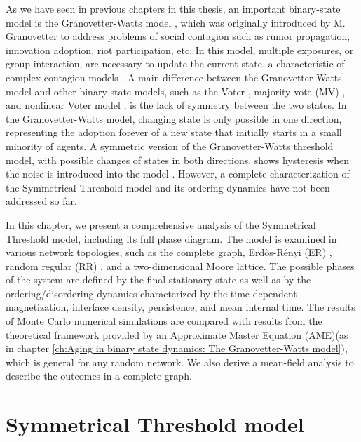 As we have seen in previous chapters in this thesis, an important binary-state model is the Granovetter-Watts model \cite{watts-2002}, which was originally introduced by M. Granovetter \cite{granovetter-1978} to address problems of social contagion such as rumor propagation, innovation adoption, riot participation, etc. In this model, multiple exposures, or group interaction, are necessary to update the current state, a characteristic of complex contagion models \cite{centola-2007,unknown-author-2018}. A main difference between the Granovetter-Watts model and other binary-state models, such as the Voter \cite{Voter-original}, majority vote (MV) \cite{de1992isotropic,pereira2005majority,campos2003small}, and nonlinear Voter model \cite{castellano-2009,mobilia2015nonlinear,mellor2016characterization,Min-2017,jewski-2017,peralta-2018}, is the lack of symmetry between the two states. In the Granovetter-Watts model, changing state is only possible in one direction, representing the adoption forever of a new state that initially starts in a small minority of agents. A symmetric version of the Granovetter-Watts threshold model, with possible changes of states in both directions, shows hysteresis when the noise is introduced into the model \cite{nowak2019homogeneous,nowak2020symmetrical}. However, a complete characterization of the Symmetrical Threshold model and its ordering dynamics have not been addressed so far.

In this chapter, we present a comprehensive analysis of the Symmetrical Threshold model, including its full phase diagram. The model is examined in various network topologies, such as the complete graph, Erd\H{o}s-Rényi (ER)  \cite{erdos1960evolution}, random regular (RR) \cite{wormald1999models}, and a two-dimensional Moore lattice. The possible phases of the system are defined by the final stationary state as well as by the ordering/disordering dynamics characterized by the time-dependent magnetization, interface density, persistence, and mean internal time. The results of Monte Carlo numerical simulations are compared with results from the theoretical framework provided by an Approximate Master Equation (AME)(as in chapter \ref{ch:Aging in binary state dynamics: The Granovetter-Watts model}), which is general for any random network. We also derive a mean-field analysis to describe the outcomes in a complete graph.

\section{\label{Symmetrical Threshold model} Symmetrical Threshold model}

